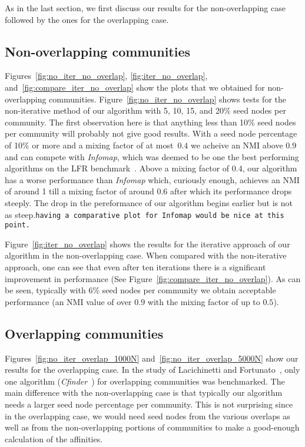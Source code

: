 As in the last section, we first discuss our results for the non-overlapping case followed by 
the ones for the overlapping case.

\subsection{Non-overlapping communities}
Figures~\ref{fig:no_iter_no_overlap}, \ref{fig:iter_no_overlap}, and~\ref{fig:compare_iter_no_overlap}
show the plots that we obtained for non-overlapping communities. Figure~\ref{fig:no_iter_no_overlap}
shows tests for the non-iterative method of our algorithm with 5, 10, 15, and 20$\%$ seed nodes per 
community. The first observation here is that anything less than 10$\%$ seed nodes per community 
will probably not give good results. With a seed node percentage of 10$\%$ or more and 
a mixing factor of at most~$0.4$ we acheive an NMI above $0.9$ and can compete with \textit{Infomap}, 
which was deemed to be one the best performing algorithms on the LFR benchmark~\cite{LF09}. 
Above a mixing factor of $0.4$, our algorithm has a worse performance than \textit{Infomap} 
which, curiously enough, achieves an NMI of around 1 till a mixing factor of around 
$0.6$ after which its performance drops steeply. The drop in the pereformance of our algorithm 
begins earlier but is not as steep.\texttt{having a comparative plot for Infomap would be nice at this point.}

Figure~\ref{fig:iter_no_overlap} shows the results for the iterative approach of 
our algorithm in the non-overlapping case. When compared with the non-iterative approach, 
one can see that even after ten iterations there is a significant improvement in 
performance (See Figure~\ref{fig:compare_iter_no_overlap}). As can be seen, typically 
with 6$\%$ seed nodes per community we obtain acceptable performance (an NMI value of 
over $0.9$ with the mixing factor of up to $0.5$).  

\subsection{Overlapping communities}
Figures~\ref{fig:no_iter_overlap_1000N} and~\ref{fig:no_iter_overlap_5000N} 
show our results for the overlapping case. In the study of Lacichinetti and Fortunato~\cite{LF09}, 
only one algorithm (\emph{Cfinder}~\cite{PDFV05}) for overlapping communities was benchmarked. 
The main difference with the non-overlapping case is that typically our algorithm needs a larger 
seed node percentage per community. This is not surprising since in the overlapping case, we would 
need seed nodes from the various overlaps as well as from the non-overlapping portions of communities 
to make a good-enough calculation of the affinities. 

